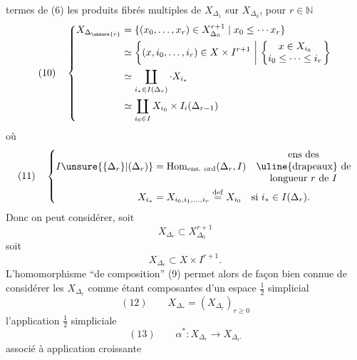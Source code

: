 termes de (6) les produits fibrés
multiples de $X_{\Delta_1}$ sur $X_{\Delta_0}$, pour $r\in\mathbb N$
\[
(10)\quad\left\{\begin{aligned}
X_{\Delta_{\unsure{r}}}&=\{(x_0,\ldots,x_r)\in X_{\Delta_0}^{r+1}\mid x_0\leq\cdots x_r\}\\
&\simeq\left\{(x,i_0,\ldots,i_r)\in X\times I^{r+1}\ \middle|\ \left\{\begin{matrix}x\in X_{i_0}\\i_0\leq\cdots\leq i_r\end{matrix}\right.\right\}\\
&\simeq\coprod_{i_*\in I(\Delta_r)}\cdot X_{i_*}\\
&\simeq\coprod_{i_0\in I}X_{i_0}\times I_i(\Delta_{r-1})
\end{aligned}\right.
\]
où
\[
(11)\quad\left\{\begin{aligned}
I\unsure{\{\Delta_r\}|(\Delta_r)}&=\operatorname{Hom}_{\text{ens. ord}}(\Delta_r,I)
\quad\begin{matrix}\text{ens des}\\\text{\uline{drapeaux} de}\\\text{longueur }r\text{ de }I\end{matrix}\\
X_{i_*}&=X_{i_0,i_1,\ldots,i_r}\overset{\mathrm{def}}{=}X_{i_0}\quad\text{si }i_*\in I(\Delta_r).
\end{aligned}\right.
\]
Donc on peut considérer, soit
\[
X_{\Delta_r}\subset X_{\Delta_0}^{r+1}
\]
soit
\[
X_{\Delta_r}\subset X\times I^{r+1}.
\]
L'homomorphisme ``de composition'' (9)
permet alors de façon bien connue de
considérer les $X_{\Delta_r}$ comme étant 
composantes d'un espace $\frac12$ simplicial
\[
(12)\qquad X_{\Delta_*}=(X_{\Delta_r})_{r\geq0}
\]
 l'application $\frac12$ simpliciale
\[
(13)\qquad\alpha^*:X_{\Delta_r}\longrightarrow X_{\Delta_{r'}}
\]
associé à  application croissante
